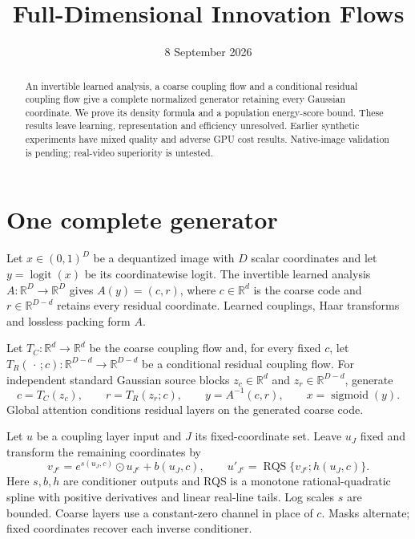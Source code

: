 \documentclass[11pt]{article}
\title{Full-Dimensional Innovation Flows}
\author{}
\date{8 September 2026}
\newcommand{\R}{\mathbb R}
\begin{document}
\maketitle
\begin{abstract}
An invertible learned analysis, a coarse coupling flow and a conditional residual coupling flow give a complete normalized generator retaining every Gaussian coordinate. We prove its density formula and a population energy-score bound. These results leave learning, representation and efficiency unresolved. Earlier synthetic experiments have mixed quality and adverse GPU cost results. Native-image validation is pending; real-video superiority is untested.
\end{abstract}

\section{One complete generator}
Let $x\in(0,1)^D$ be a dequantized image with $D$ scalar coordinates and let $y=\operatorname{logit}(x)$ be its coordinatewise logit. The invertible learned analysis $A:\R^D\to\R^D$ gives $A(y)=(c,r)$, where $c\in\R^d$ is the coarse code and $r\in\R^{D-d}$ retains every residual coordinate. Learned couplings, Haar transforms and lossless packing form $A$.


Let $T_C:\R^d\to\R^d$ be the coarse coupling flow and, for every fixed $c$, let $T_R(\,\cdot\,;c):\R^{D-d}\to\R^{D-d}$ be a conditional residual coupling flow. For independent standard Gaussian source blocks $z_c\in\R^d$ and $z_r\in\R^{D-d}$, generate
\begin{equation}\label{eq:generator}
 c=T_C(z_c),\qquad r=T_R(z_r;c),\qquad y=A^{-1}(c,r),\qquad x=\operatorname{sigmoid}(y).
\end{equation}
Global attention conditions residual layers on the generated coarse code.

Let $u$ be a coupling layer input and $J$ its fixed-coordinate set. Leave $u_J$ fixed and transform the remaining coordinates by
\begin{equation}
 v_{J^c}=e^{s(u_J,c)}\odot u_{J^c}+b(u_J,c),\qquad
 u'_{J^c}=\operatorname{RQS}\{v_{J^c};h(u_J,c)\}.
\end{equation}
Here $s,b,h$ are conditioner outputs and RQS is a monotone rational-quadratic spline with positive derivatives and linear real-line tails. Log scales $s$ are bounded. Coarse layers use a constant-zero channel in place of $c$. Masks alternate; fixed coordinates recover each inverse conditioner.
\end{document}
